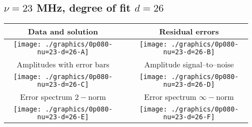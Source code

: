 

% 

\clearpage{}
\break{}

\subsection{$\nu = 23$ MHz, degree of fit $d = 26$}

\begin{table}[h]
    \begin{center}
        \begin{tabular}{ccc}
            Data and solution & \quad & Residual errors \\\hline
            \texttt{[image: ./graphics/0p080-nu=23-d=26-A]} &&
            \texttt{[image: ./graphics/0p080-nu=23-d=26-B]} \\[15pt]
            Amplitudes with error bars && Amplitude signal--to--noise \\\hline
            \texttt{[image: ./graphics/0p080-nu=23-d=26-C]} &&
            \texttt{[image: ./graphics/0p080-nu=23-d=26-D]} \\[15pt]
            Error spectrum $2-$norm && Error spectrum $\infty-$norm \\\hline
            \texttt{[image: ./graphics/0p080-nu=23-d=26-E]} &&
            \texttt{[image: ./graphics/0p080-nu=23-d=26-F]} \\[15pt]
        \end{tabular}
    \end{center}
\label{fig:elev=80, nu=23}
\end{table}



\endinput
